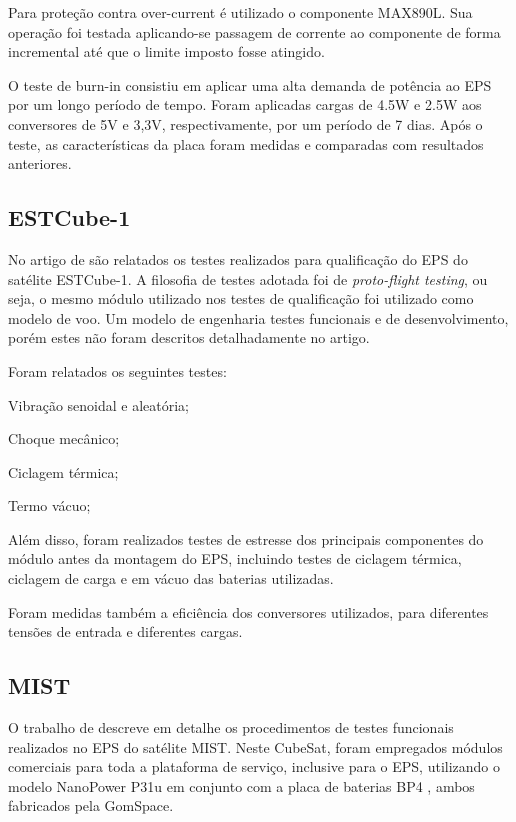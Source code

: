 Para proteção contra over-current é utilizado o componente MAX890L. Sua operação foi testada aplicando-se passagem de corrente ao componente de forma incremental até que o limite imposto fosse atingido.

O teste de burn-in consistiu em aplicar uma alta demanda de potência ao EPS por um longo período de tempo.
Foram aplicadas cargas de 4.5W e 2.5W aos conversores de 5V e 3,3V, respectivamente, por um período de 7 dias. Após o teste, as características da placa foram medidas e comparadas com resultados anteriores.

\subsection{ESTCube-1}

No artigo de \textcite{estcube-eps} são relatados os testes realizados para qualificação do \gls{EPS} do satélite ESTCube-1. A filosofia de testes adotada foi de \textit{proto-flight testing}, ou seja, o mesmo módulo utilizado nos testes de qualificação foi utilizado como modelo de voo.
Um modelo de engenharia testes funcionais e de desenvolvimento, porém estes não foram descritos detalhadamente no artigo.

Foram relatados os seguintes testes:
\begin{alineas}
    \item Vibração senoidal e aleatória;
    \item Choque mecânico;
    \item Ciclagem térmica;
    \item Termo vácuo;
\end{alineas}

Além disso, foram realizados testes de estresse dos principais componentes do módulo antes da montagem do \gls{EPS}, incluindo testes de ciclagem térmica, ciclagem de carga e em vácuo das baterias utilizadas.

Foram medidas também a eficiência dos conversores utilizados, para diferentes tensões de entrada e diferentes cargas.


\subsection{MIST}

O trabalho de \textcite{mist-eps} descreve em detalhe os procedimentos de testes funcionais realizados no \gls{EPS} do satélite MIST.
Neste CubeSat, foram empregados módulos comerciais para toda a plataforma de serviço, inclusive para o \gls{EPS}, utilizando o modelo NanoPower P31u \cite{p31u-datasheet} em conjunto com a placa de baterias BP4 \cite{bp4-datasheet}, ambos fabricados pela GomSpace.

